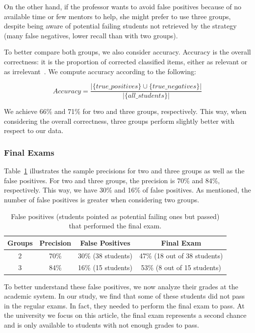 On the other hand, if the professor wants to avoid false positives because of no available time or few mentors to help, she might prefer to use three groups, despite being aware of potential failing students not retrieved by the strategy (many false negatives, lower recall than with two groups). 

To better compare both groups, we also consider accuracy. Accuracy is the overall correctness: it is the proportion of corrected classified items, either as relevant or as irrelevant~\cite{evaluation-text}. We compute accuracy according to the following:

\vspace{0.1cm}
$$
Accuracy = \frac{| \{true\_positives\} \cup \{true\_negatives\} |}{| \{all\_students\} |}
$$
\vspace{0.1cm}

We achieve 66\% and 71\% for two and three groups, respectively. This way, when considering the overall correctness, three groups perform slightly better with respect to our data.

\subsubsection{Final Exams}

Table~\ref{tab:final-exams} illustrates the sample precisions for two and three groups as well as the false positives. For two and three groups, the precision is 70\% and 84\%, respectively. This way, we have 30\% and 16\% of false positives. As mentioned, the number of false positives is greater when considering two groups.

\begin{table}[h]
\centering
\begin{tabular}{|c|c|c|c|}
\hline
\textbf{Groups} & \textbf{Precision} & \textbf{False Positives} & \textbf{Final Exam}\\ \hline
2 & 70\% & 30\% (38 students) & 47\% (18 out of 38 students)\\ \hline
3 & 84\% & 16\% (15 students) & 53\% (8 out of 15 students)\\ \hline
\end{tabular}
\caption{False positives (students pointed as potential failing ones but passed) that performed the final exam.}
\label{tab:final-exams}
\end{table}

To better understand these false positives, we now analyze their grades at the academic system. In our study, we find that some of these students did not pass in the regular exams. In fact, they needed to perform the final exam to pass. At the university we focus on this article, the final exam represents a second chance and is only available to students with not enough grades to pass.

